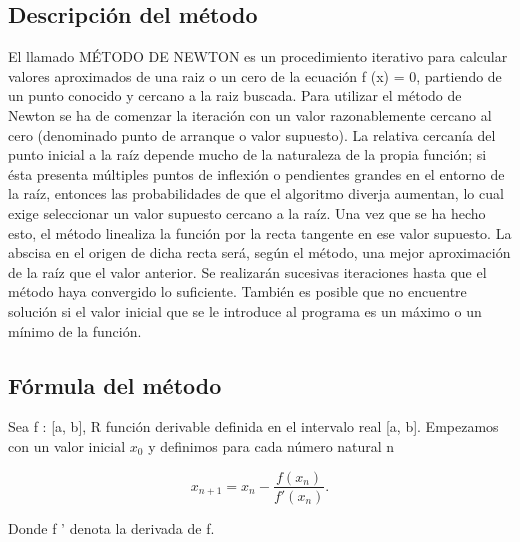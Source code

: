 \documentclass[a4paper,10pt]{article}
\begin{document}
\subsection{Descripción del método}
El llamado MÉTODO DE NEWTON es un procedimiento iterativo para calcular valores aproximados de una raiz o un cero de la ecuación f (x) = 0, partiendo de un punto conocido y cercano a la raiz buscada. 
Para utilizar el método de Newton se ha de comenzar la iteración con un valor razonablemente cercano al cero (denominado punto de arranque o valor supuesto). La relativa cercanía del punto inicial a la raíz depende mucho de la naturaleza de la propia función; si ésta presenta múltiples puntos de inflexión o pendientes grandes en el entorno de la raíz, entonces las probabilidades de que el algoritmo diverja aumentan, lo cual exige seleccionar un valor supuesto cercano a la raíz. Una vez que se ha hecho esto, el método linealiza la función por la recta tangente en ese valor supuesto. La abscisa en el origen de dicha recta será, según el método, una mejor aproximación de la raíz que el valor anterior. Se realizarán sucesivas iteraciones hasta que el método haya convergido lo suficiente.
También es posible que no encuentre solución si el valor inicial que se le introduce al programa es un máximo o un mínimo de la función.
\subsection{Fórmula del método}
Sea f : [a, b], R función derivable definida en el intervalo real [a, b]. Empezamos con un valor inicial $x_0$ y definimos para cada número natural n

   $$ x_{n+1} = x_n - \frac{f(x_n)}{f'(x_n)}.$$

Donde f ' denota la derivada de f.
\newpage
\end{document}
